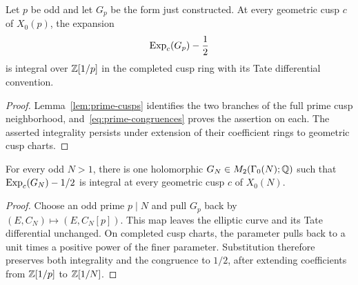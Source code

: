 \begin{proposition}\label{prop:global-parity}
Let $p$ be odd and let $G_p$ be the form just constructed. At every
geometric cusp $c$ of $X_0(p)$, the expansion
\[
 \operatorname{Exp}_c(G_p)-\frac12
\]
is integral over $\mathbb Z[1/p]$ in the completed cusp ring with its Tate
differential convention.
\end{proposition}
\begin{proof}
Lemma~\ref{lem:prime-cusps} identifies the two branches of the full
prime cusp neighborhood, and~\eqref{eq:prime-congruences} proves the
assertion on each. The asserted integrality persists under extension
of their coefficient rings to geometric cusp charts.
\end{proof}

\begin{theorem}\label{thm:simultaneous}
For every odd $N>1$, there is one holomorphic
$G_N\in M_2(\Gamma_0(N);\mathbb Q)$ such that
$\operatorname{Exp}_c(G_N)-1/2$ is integral at every geometric cusp $c$ of $X_0(N)$.
\end{theorem}
\begin{proof}
Choose an odd prime $p\mid N$ and pull $G_p$ back by
$(E,C_N)\mapsto(E,C_N[p])$. This map leaves the elliptic curve and
its Tate differential unchanged. On completed cusp charts, the
parameter pulls back to a unit times a positive power of the finer
parameter. Substitution therefore preserves both integrality and the
congruence to $1/2$, after extending coefficients from $\mathbb Z[1/p]$
to $\mathbb Z[1/N]$.
\end{proof}

